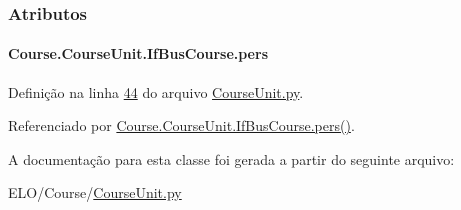 \subsubsection{Atributos}
\hypertarget{classCourse_1_1CourseUnit_1_1IfBusCourse_ab926ae8fb127b7697e2b63025df09a78}{
\paragraph[{pers}]{\setlength{\rightskip}{0pt plus 5cm}Course.\-Course\-Unit.\-If\-Bus\-Course.\-pers}}\label{classCourse_1_1CourseUnit_1_1IfBusCourse_ab926ae8fb127b7697e2b63025df09a78}


Definição na linha \hyperlink{CourseUnit_8py_source_l00044}{44} do arquivo \hyperlink{CourseUnit_8py_source}{Course\-Unit.\-py}.



Referenciado por \hyperlink{classCourse_1_1CourseUnit_1_1IfBusCourse_adf5702dec1a99bbb31936b7f1d425a40}{Course.\-Course\-Unit.\-If\-Bus\-Course.\-pers()}.



A documentação para esta classe foi gerada a partir do seguinte arquivo\-:\begin{DoxyCompactItemize}
\item 
E\-L\-O/\-Course/\hyperlink{CourseUnit_8py}{Course\-Unit.\-py}\end{DoxyCompactItemize}

